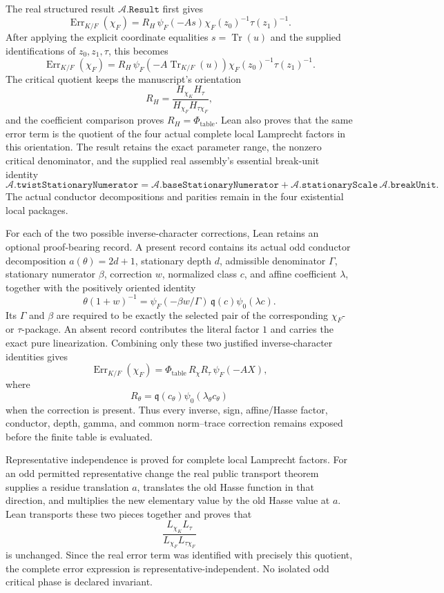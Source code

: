 \begin{theorem}
The real structured result \(\mathcal A.\texttt{Result}\) first gives
\[
 \operatorname{Err}_{K/F}(\chi_F)
 =R_H\,\psi_F(-A s)\chi_F(z_0)^{-1}\tau(z_1)^{-1}.
\]
After applying the explicit coordinate equalities \(s=\operatorname{Tr}(u)\)
and the supplied identifications of \(z_0,z_1,\tau\), this becomes
\[
 \operatorname{Err}_{K/F}(\chi_F)
 =R_H\,
   \psi_F\!\left(-A\operatorname{Tr}_{K/F}(u)\right)
   \chi_F(z_0)^{-1}\tau(z_1)^{-1}.
\]
The critical quotient keeps the manuscript's orientation
\[
 R_H=\frac{H_{\chi_K}H_\tau}{H_{\chi_F}H_{\tau\chi_F}},
\]
and the coefficient comparison proves
\(R_H=\Phi_{\mathrm{table}}\).  Lean also proves that the same error term is
the quotient of the four actual complete local Lamprecht factors in this
orientation.  The result retains the exact parameter range, the nonzero
critical denominator, and the supplied real assembly's essential break-unit
identity
\[
 \mathcal A.\texttt{twistStationaryNumerator}
 =\mathcal A.\texttt{baseStationaryNumerator}
  +\mathcal A.\texttt{stationaryScale}\,
    \mathcal A.\texttt{breakUnit}.
\]
The actual conductor decompositions and parities remain in the four
existential local packages.

For each of the two possible inverse-character corrections, Lean retains an
optional proof-bearing record.  A present record contains its actual odd
conductor decomposition \(a(\theta)=2d+1\), stationary depth \(d\),
admissible denominator \(\Gamma\), stationary numerator \(\beta\), correction
\(w\), normalized class \(c\), and affine coefficient \(\lambda\), together
with the positively oriented identity
\[
 \theta(1+w)^{-1}
 =\psi_F(-\beta w/\Gamma)\,
   \mathfrak q(c)\psi_0(\lambda c).
\]
Its \(\Gamma\) and \(\beta\) are required to be exactly the selected pair of
the corresponding \(\chi_F\)- or \(\tau\)-package.  An absent record
contributes the literal factor \(1\) and carries the exact pure
linearization.  Combining only these two justified inverse-character
identities gives
\[
 \operatorname{Err}_{K/F}(\chi_F)
 =\Phi_{\mathrm{table}}\,R_\chi R_\tau\,\psi_F(-AX),
\]
where
\[
 R_\theta=\mathfrak q(c_\theta)
   \psi_0(\lambda_\theta c_\theta)
\]
when the correction is present.  Thus every inverse, sign, affine/Hasse
factor, conductor, depth, gamma, and common norm--trace correction remains
exposed before the finite table is evaluated.

Representative independence is proved for complete local Lamprecht factors.
For an odd permitted representative change the real public transport theorem
supplies a residue translation \(a\), translates the old Hasse function in
that direction, and multiplies the new elementary value by the old Hasse
value at \(a\).  Lean transports these two pieces together and proves that
\[
 \frac{L_{\chi_K}L_\tau}{L_{\chi_F}L_{\tau\chi_F}}
\]
is unchanged.  Since the real error term was identified with precisely this
quotient, the complete error expression is representative-independent.  No
isolated odd critical phase is declared invariant.


\end{theorem}
